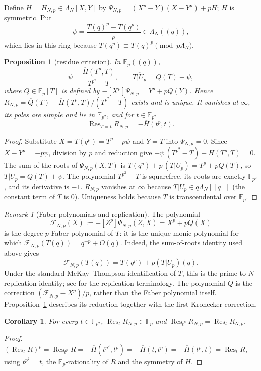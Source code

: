 \documentclass[11pt,a4paper]{article}
\numberwithin{equation}{section}
\newtheorem{proposition}[theorem]{Proposition}
\newtheorem{corollary}[theorem]{Corollary}
\theoremstyle{definition}
\theoremstyle{remark}
\newtheorem{remark}[theorem]{Remark}
\newcommand{\Fp}{\mathbb F_p}
\newcommand{\Fq}{\mathbb F_{p^2}}
\newcommand{\Res}{\operatorname{Res}}
\begin{document}
Define $H=H_{N,p}\in\Lambda_N[X,Y]$ by $\Psi_{N,p}=(X^p-Y)(X-Y^p)+pH$; $H$ is symmetric. Put
\[
\psi=\frac{T(q)^p-T(q^p)}{p}\in\Lambda_N((q)),
\]
which lies in this ring because
$T(q^p)\equiv T(q)^p\pmod{p\Lambda_N}$.

\begin{proposition}[residue criterion]\label{prop:res}
In $\Fp((q))$,
\[
\overline\psi=\frac{\overline H(T^p,T)}{T^{p^2}-T},\qquad
\overline{T|U_p}=\overline Q(T)+\overline\psi,
\]
where $\overline Q\in\Fp[T]$ is defined by $-[X^p]\Psi_{N,p}=Y^p+pQ(Y)$. Hence
$R_{N,p}=\overline Q(T)+\overline H(T^p,T)/(T^{p^2}-T)$ exists and is unique. It vanishes at
$\infty$, its poles are simple and lie in $\Fq$, and for $t\in\Fq$
\[
\Res_{T=t}R_{N,p}=-\overline H(t^p,t).
\]
\end{proposition}
\begin{proof}
Substitute $X=T(q^p)=T^p-p\psi$ and $Y=T$ into
$\Psi_{N,p}=0$. Since $X-Y^p=-p\psi$, division by $p$ and reduction give
$-\overline\psi\,(T^{p^2}-T)+\overline H(T^p,T)=0$. The sum of the roots of $\Psi_{N,p}(X,T)$ is
$T(q^p)+p\,(T|U_p)=T^p+pQ(T)$, so $T|U_p=Q(T)+\psi$. The polynomial $T^{p^2}-T$ is squarefree, its
roots are exactly $\Fq$, and its derivative is $-1$. $R_{N,p}$ vanishes at $\infty$ because
$T|U_p\in q\Lambda_N[[q]]$ (the constant term of $T$ is $0$). Uniqueness holds because $\overline T$ is
transcendental over $\Fp$.
\end{proof}

\begin{remark}[Faber polynomials and replication]\label{rem:faber}
The polynomial
\[
\mathcal F_{N,p}(X):=-[Z^p]\Psi_{N,p}(Z,X)=X^p+pQ(X)
\]
is the degree-$p$ Faber polynomial of $T$: it is the unique monic
polynomial for which $\mathcal F_{N,p}(T(q))=q^{-p}+O(q)$. Indeed, the
sum-of-roots identity used above gives
\[
\mathcal F_{N,p}(T(q))=T(q^p)+p(T|U_p)(q).
\]
Under the standard McKay--Thompson identification of $T$, this is the
prime-to-$N$ replication identity; see \citet[\S8]{CN79} for the
replication terminology. The polynomial $Q$ is the correction
$(\mathcal F_{N,p}-X^p)/p$, rather than the Faber polynomial itself.
Proposition~\ref{prop:res} describes its reduction together with the
first Kronecker correction.
\end{remark}

\begin{corollary}\label{cor:rFp}
For every $t\in\Fq$, $\Res_{t}R_{N,p}\in\Fp$ and $\Res_{t^p}R_{N,p}=\Res_tR_{N,p}$.
\end{corollary}
\begin{proof}
$(\Res_tR)^p=\Res_{t^p}R=-\overline H(t^{p^2},t^p)=-\overline H(t,t^p)=-\overline H(t^p,t)=\Res_tR$, using
$t^{p^2}=t$, the $\Fp$-rationality of $R$ and the symmetry of $H$.
\end{proof}
\end{document}
